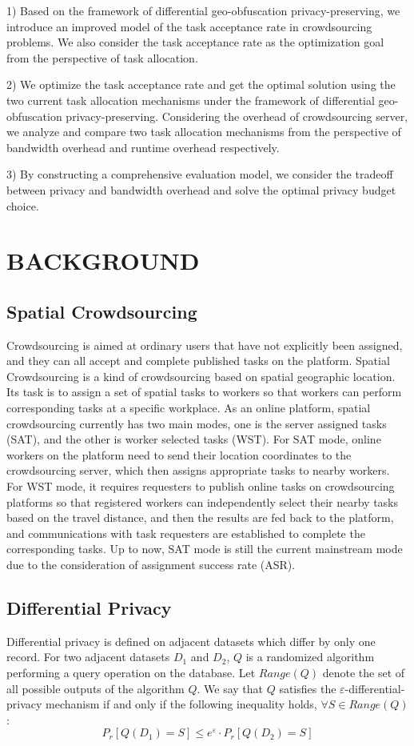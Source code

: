 1) Based on the framework of differential geo-obfuscation privacy-preserving, we introduce an improved model of the task acceptance rate in crowdsourcing problems. We also consider the task acceptance rate as the optimization goal from the perspective of task allocation.

2) We optimize the task acceptance rate and get the optimal solution using the two current task allocation mechanisms under the framework of differential geo-obfuscation privacy-preserving. Considering the overhead of crowdsourcing server, we analyze and compare two task allocation mechanisms from the perspective of bandwidth overhead and runtime overhead respectively.

3) By constructing a comprehensive evaluation model, we consider the tradeoff between privacy and bandwidth overhead and solve the optimal privacy budget choice.

\section{BACKGROUND} %
\subsection{Spatial Crowdsourcing} %
Crowdsourcing is aimed at ordinary users that have not explicitly been assigned, and they can all accept and complete published tasks on the platform. Spatial Crowdsourcing is a kind of crowdsourcing based on spatial geographic location. Its task is to assign a set of spatial tasks to workers so that workers can perform corresponding tasks at a specific workplace. As an online platform, spatial crowdsourcing currently has two main modes, one is the server assigned tasks (SAT), and the other is worker selected tasks (WST). For SAT mode, online workers on the platform need to send their location coordinates to the crowdsourcing server, which then assigns appropriate tasks to nearby workers. For WST mode, it requires requesters to publish online tasks on crowdsourcing platforms so that registered workers can independently select their nearby tasks based on the travel distance, and then the results are fed back to the platform, and communications with task requesters are established to complete the corresponding tasks. Up to now, SAT mode is still the current mainstream mode due to the consideration of assignment success rate (ASR).

\subsection{Differential Privacy} %
\begin{definition}
	Differential privacy is defined on adjacent datasets which differ by only one record. For two adjacent datasets $D_1$ and $D_2$, $Q$ is a randomized algorithm performing a query operation on the database. Let $Range(Q)$ denote the set of all possible outputs of the algorithm $Q$. We say that $Q$ satisfies the $\varepsilon$-differential-privacy mechanism if and only if the following inequality holds, $\forall S \in Range(Q)$:
	$$
	P_r[Q(D_1)=S]\leq e^\varepsilon \cdot P_r [Q(D_2)=S]
	$$
\end{definition}

